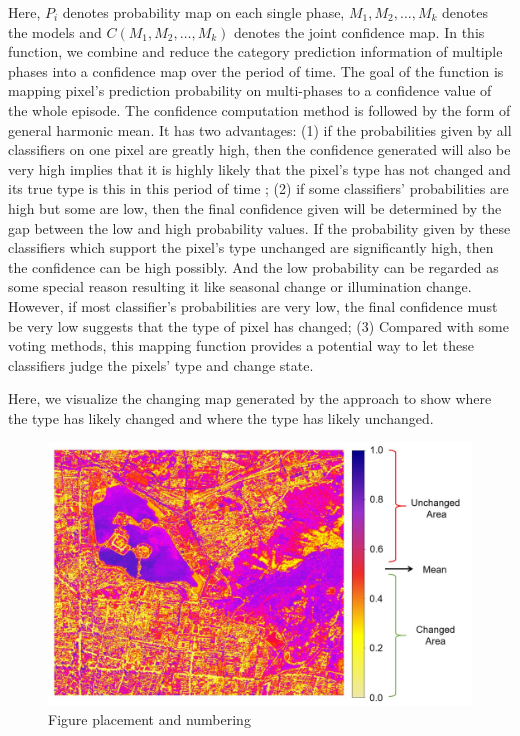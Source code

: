 \documentclass{isprs} %
\begin{document}
Here, $P_i$ denotes probability map on each single phase, $M_1,M_2,\dots,M_k$ denotes the models and $C(M_1,M_2,\dots,M_k)$ denotes the joint confidence map. In this function, we combine and reduce the category prediction information of multiple phases into a confidence map over the period of time. The goal of the function is mapping pixel's prediction probability on multi-phases to a confidence value of the whole episode. The confidence computation method is followed by the form of general harmonic mean. It has two advantages: (1) if the probabilities given by all classifiers on one pixel are greatly high, then the confidence generated will also be very high implies that it is highly likely that the pixel's type has not changed and its true type is this in this period of time ; (2) if some classifiers' probabilities are high but some are low, then the final confidence given will be determined by the gap between the low and high probability values. If the probability given by these classifiers which support the pixel's type unchanged are significantly high, then the confidence can be high possibly. And the low probability can be regarded as some special reason resulting it like seasonal change or illumination change. However, if most classifier's probabilities are very low, the final confidence must be very low suggests that the type of pixel has changed; (3) Compared with some voting methods, this mapping function provides a potential way to let these classifiers judge the pixels' type and change state.

Here, we visualize the changing map generated by the approach to show where the type has likely changed and where the type has likely unchanged.

\begin{figure}[ht!]
	\begin{center}
			\includegraphics[width=1.0\columnwidth]{figures/images/unchangedMap.jpg}
		\caption{Figure placement and numbering}
	\label{fig:figure_placement}
	\end{center}
\end{figure}
\end{document}
